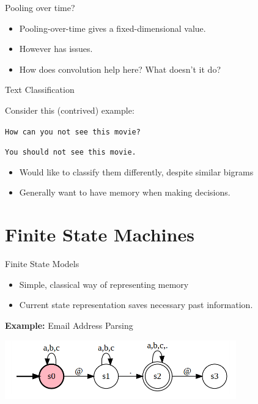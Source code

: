 \documentclass{beamer}
\begin{document}
\begin{frame}{Pooling over time?}
  \begin{itemize}
  \item Pooling-over-time gives a fixed-dimensional value.
    \air
  \item However has issues.
    \air
  \item How does convolution help here? What doesn't it do?
  \end{itemize}
\end{frame}

\begin{frame}{Text Classification}

  Consider this (contrived) example:

  \air 
  \texttt{How can you not see this movie?}
  \air 

  \texttt{You should not see this movie.}

  \air
  \begin{itemize}
  \item Would like to classify them differently, despite similar bigrams

    \air

  \item Generally want to have \alert{memory} when making decisions.
  \end{itemize}

\end{frame}

\section{Finite State Machines}

\begin{frame}{Finite State Models}
  \begin{itemize}
  \item Simple, classical way of representing memory

    \air 

  \item Current state representation saves necessary past information.
    \air 
  \end{itemize}
  \textbf{Example:} Email Address Parsing
  \begin{center}
    \includegraphics[width=10cm]{email}
  \end{center}

\end{frame}
\end{document}
